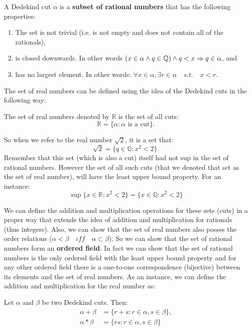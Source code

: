 \begin{definition}
	A Dedekind cut $\alpha$ is a \textbf{subset of rational numbers} that has the following properties:
	\begin{enumerate}
		\item The set is not trivial (i.e. is not empty and does not contain all of the rationals),
		\item is closed downwards. In other words $(x \in \alpha \wedge q \in \mathbb{Q}) \wedge q < x \Rightarrow q \in \alpha$, and 
		\item has no largest element. In other words: $\forall x \in \alpha, \exists r \in \alpha \quad s.t. \quad x<r$.
	\end{enumerate} 
\end{definition}

The set of real numbers can be defined using the idea of the Dedekind cuts in the following way:

\begin{definition}
	The set of real numbers denoted by $\mathbb{R}$ is the set of all cuts:
	\[ \mathbb{R} = \{ \alpha: \alpha \text{ is a cut} \}. \]
\end{definition}

So when we refer to the real number $\sqrt{2}$, it is a set that:
\[ \sqrt{2} = \{ q \in \mathbb{Q} : x^2 < 2 \}. \]
Remember that this set (which is also a cut) itself had not sup in the set of rational numbers. However the set of all such cuts (that we denoted that set as the set of real number), will have the least upper bound property. For an instance:
\[ \sup \{ x \in \mathbb{R} : x^2 < 2 \} = \{ x \in \mathbb{Q} : x^2 < 2 \} \]

We can define the addition and multiplication operations for these sets (cuts) in a proper way that extends the idea of addition and multiplication for rationals (thus integers). Also, we can show that the set of real numbers also posses the order relations ($\alpha < \beta \quad iff \quad \alpha \subset \beta$). So we can show that the set of rational numbers form an \textbf{ordered field}. In fact we can show that the set of rational numbers is the only ordered field with the least upper bound property and for any other ordered field there is a one-to-one correspondence (bijective) between its elements and the set of real numbers. As an instance, we can define the addition and multiplication for the real number as:
\begin{definition}
	Let $\alpha$ and $\beta$ be two Dedekind cuts. Then:
	\begin{align*}
		\alpha + \beta &= \{ r+s : r \in \alpha, s \in \beta \}, \\
		\alpha * \beta &= \{ rs  : r \in \alpha, s \in \beta \}
	\end{align*}
\end{definition} 

